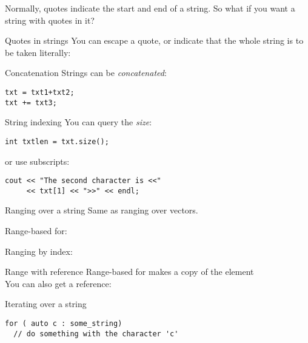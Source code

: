 Normally, quotes indicate the start and end of a string. So what if
you want a string with quotes in it?

\begin{block}{Quotes in strings}
  \label{sl:string-quote}
  You can escape a quote, or indicate that the whole string is to be
  taken literally:
\end{block}

\begin{block}{Concatenation}
  \label{sl:string-plus}
  Strings can be \emph{concatenated}:
\begin{lstlisting}
txt = txt1+txt2;
txt += txt3;
\end{lstlisting}
\end{block}

\begin{block}{String indexing}
  \label{sl:string-vector}
  You can query the \emph{size}:
\begin{lstlisting}
int txtlen = txt.size();
\end{lstlisting}
or use subscripts:
\begin{lstlisting}
cout << "The second character is <<"
     << txt[1] << ">>" << endl;
\end{lstlisting}
\end{block}

\begin{block}{Ranging over a string}
  \label{sl:string-index}
  Same as ranging over vectors.

  Range-based for:

  Ranging by index:

\end{block}

\begin{block}{Range with reference}
  \label{sl:string-index-ref}
  Range-based for makes a copy of the element\\
  You can also get a reference:
\end{block}

\begin{block}{Iterating over a string}
\begin{lstlisting}
for ( auto c : some_string)
  // do something with the character 'c'
\end{lstlisting}
\end{block}

